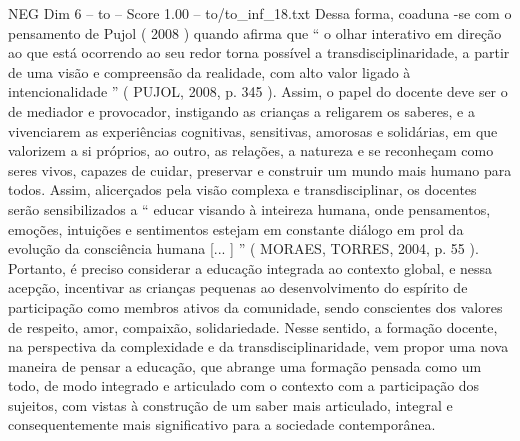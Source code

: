 \begin{textsample}{NEG Dim 6 – to – Score 1.00 – to/to\_inf\_18.txt}
Dessa forma, coaduna -se com o pensamento de Pujol ( 2008 ) quando afirma que “ o olhar interativo em direção ao que está ocorrendo ao seu redor torna possível a transdisciplinaridade, a partir de uma visão e compreensão da realidade, com alto valor ligado à intencionalidade ” ( PUJOL, 2008, p. 345 ).
Assim, o papel do docente deve ser o de mediador e provocador, instigando as crianças a religarem os saberes, e a vivenciarem as experiências cognitivas, sensitivas, amorosas e solidárias, em que valorizem a si próprios, ao outro, as relações, a natureza e se reconheçam como seres vivos, capazes de cuidar, preservar e construir um mundo mais humano para todos.
Assim, alicerçados pela visão complexa e transdisciplinar, os docentes serão sensibilizados a “ educar visando à inteireza humana, onde pensamentos, emoções, intuições e sentimentos estejam em constante diálogo em prol da evolução da consciência humana [... ] ” ( MORAES, TORRES, 2004, p. 55 ).
Portanto, é preciso considerar a educação integrada ao contexto global, e nessa acepção, incentivar as crianças pequenas ao desenvolvimento do espírito de participação como membros ativos da comunidade, sendo conscientes dos valores de respeito, amor, compaixão, solidariedade.
Nesse sentido, a formação docente, na perspectiva da complexidade e da transdisciplinaridade, vem propor uma nova maneira de pensar a educação, que abrange uma formação pensada como um todo, de modo integrado e articulado com o contexto com a participação dos sujeitos, com vistas à construção de um saber mais articulado, integral e consequentemente mais significativo para a sociedade contemporânea.

\end{textsample}

